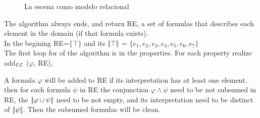 \begin{figure}
\begin{minipage}[b]{0.6\linewidth}
\caption{La escena como modelo relacional}\label{GRE3D7-stimulus-graph}
\end{minipage}
\end{figure}


The algorithm always ends, and return RE, a set of formulas that describes each element in the domain (if that formula exists).\\

In the begining RE=$\{\top\}$ and its $|\!|\top|\!|$ = $\{e_1, e_2, e_3, e_4, e_5, e_6, e_7\}$\\

The first loop for of the algorithm is in the properties. For each property realize add$_\mathcal{EL}$ ($\varphi$, RE),

A formula $\varphi$ will be added to RE if its interpretation has at least one element, then for each formula $\psi$ in RE the conjunction 
$\varphi  \wedge \psi$ need to be not subsumed in RE, the $|\!|\varphi \cup \psi|\!|$ need to be not empty, and its interpretation need to be distinct of $|\!|\psi|\!|$. Then the subsumed formulas will be clean.


